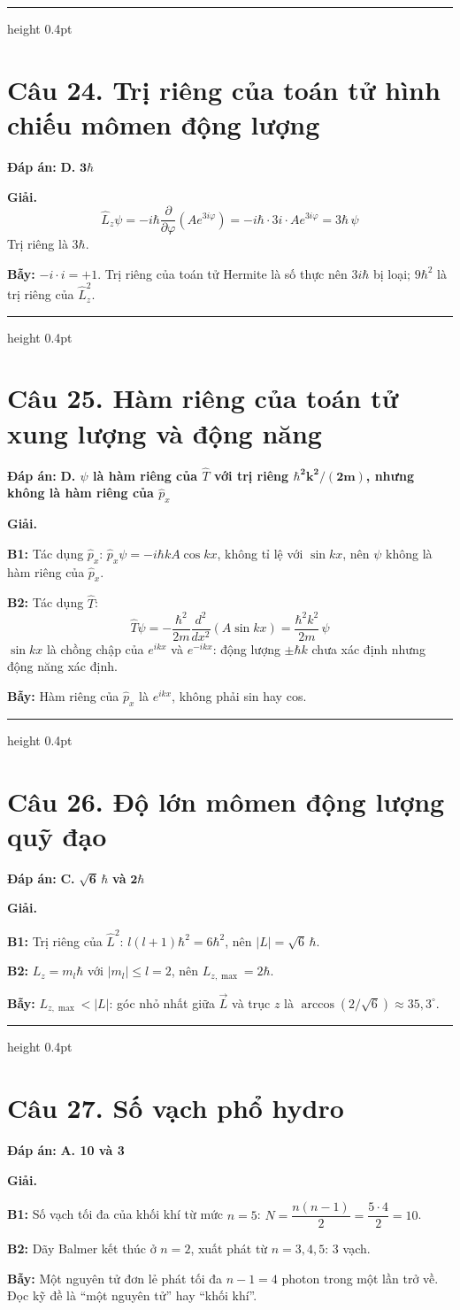 \documentclass[11pt,a4paper]{article}
\renewcommand{\boldsymbol}[1]{\symbf{#1}}
\newcommand{\Cau}[2]{\par\Needspace{7\baselineskip}\section*{Câu #1. #2}}
\newcommand{\DapAn}[1]{\textbf{Đáp án:} #1\par}
\newcommand{\Bay}[1]{\par\textbf{Bẫy:} #1\par}
\newcommand{\PhanCachBai}{%
  \par\Needspace{7\baselineskip}%
  \addvspace{6pt}%
  {\color{black!40}\hrule height 0.4pt}%
  \nobreak\vspace{7pt}\nobreak
}
\begin{document}
\PhanCachBai
\Cau{24}{Trị riêng của toán tử hình chiếu mômen động lượng}
\DapAn{\textbf{D.} $\boldsymbol{3\hbar}$}

\textbf{Giải.}
\begin{equation*}
    \hat L_z\psi=-i\hbar\frac{\partial}{\partial\varphi}\left(Ae^{3i\varphi}\right)=-i\hbar\cdot3i\cdot Ae^{3i\varphi}=3\hbar\,\psi
\end{equation*}
Trị riêng là $3\hbar$.
\Bay{$-i\cdot i=+1$. Trị riêng của toán tử Hermite là số thực nên $3i\hbar$ bị loại; $9\hbar^2$ là trị riêng của $\hat L_z^2$.}

\PhanCachBai
\Cau{25}{Hàm riêng của toán tử xung lượng và động năng}
\DapAn{\textbf{D. $\psi$ là hàm riêng của $\hat T$ với trị riêng $\boldsymbol{\hbar^2k^2/(2m)}$, nhưng không là hàm riêng của $\hat p_x$}}

\textbf{Giải.}

\textbf{B1:} Tác dụng $\hat p_x$: $\hat p_x\psi=-i\hbar kA\cos kx$, không tỉ lệ với $\sin kx$, nên $\psi$ không là hàm riêng của $\hat p_x$.

\textbf{B2:} Tác dụng $\hat T$:
\begin{equation*}
    \hat T\psi=-\frac{\hbar^2}{2m}\frac{d^2}{dx^2}\left(A\sin kx\right)=\frac{\hbar^2k^2}{2m}\,\psi
\end{equation*}
$\sin kx$ là chồng chập của $e^{ikx}$ và $e^{-ikx}$: động lượng $\pm\hbar k$ chưa xác định nhưng động năng xác định.
\Bay{Hàm riêng của $\hat p_x$ là $e^{ikx}$, không phải sin hay cos.}

\PhanCachBai
\Cau{26}{Độ lớn mômen động lượng quỹ đạo}
\DapAn{\textbf{C.} $\boldsymbol{\sqrt6\,\hbar}$ \textbf{và} $\boldsymbol{2\hbar}$}

\textbf{Giải.}

\textbf{B1:} Trị riêng của $\hat L^2$: $l(l+1)\hbar^2=6\hbar^2$, nên $|L|=\sqrt6\,\hbar$.

\textbf{B2:} $L_z=m_l\hbar$ với $|m_l|\le l=2$, nên $L_{z,\max}=2\hbar$.
\Bay{$L_{z,\max}<|L|$: góc nhỏ nhất giữa $\vec L$ và trục $z$ là $\arccos(2/\sqrt6)\approx35{,}3^\circ$.}

\PhanCachBai
\Cau{27}{Số vạch phổ hydro}
\DapAn{\textbf{A. 10 và 3}}

\textbf{Giải.}

\textbf{B1:} Số vạch tối đa của khối khí từ mức $n=5$: $N=\dfrac{n(n-1)}{2}=\dfrac{5\cdot4}{2}=10$.

\textbf{B2:} Dãy Balmer kết thúc ở $n=2$, xuất phát từ $n=3,4,5$: 3 vạch.
\Bay{Một nguyên tử đơn lẻ phát tối đa $n-1=4$ photon trong một lần trở về. Đọc kỹ đề là ``một nguyên tử'' hay ``khối khí''.}
\end{document}
